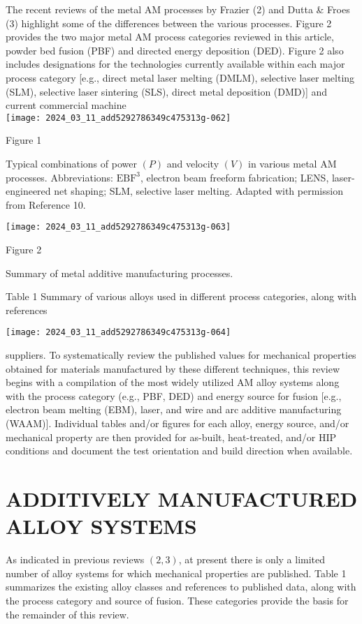 \documentclass[10pt]{article}
\begin{document}
The recent reviews of the metal AM processes by Frazier (2) and Dutta \& Froes (3) highlight some of the differences between the various processes. Figure 2 provides the two major metal AM process categories reviewed in this article, powder bed fusion (PBF) and directed energy deposition (DED). Figure 2 also includes designations for the technologies currently available within each major process category [e.g., direct metal laser melting (DMLM), selective laser melting (SLM), selective laser sintering (SLS), direct metal deposition (DMD)] and current commercial machine\\
\texttt{[image: 2024\_03\_11\_add5292786349c475313g-062]}

Figure 1

Typical combinations of power $(P)$ and velocity $(V)$ in various metal AM processes. Abbreviations: $\mathrm{EBF}^{3}$, electron beam freeform fabrication; LENS, laser-engineered net shaping; SLM, selective laser melting. Adapted with permission from Reference 10.

\begin{center}
\texttt{[image: 2024\_03\_11\_add5292786349c475313g-063]}
\end{center}

Figure 2

Summary of metal additive manufacturing processes.

Table 1 Summary of various alloys used in different process categories, along with references

\begin{center}
\texttt{[image: 2024\_03\_11\_add5292786349c475313g-064]}
\end{center}

suppliers. To systematically review the published values for mechanical properties obtained for materials manufactured by these different techniques, this review begins with a compilation of the most widely utilized AM alloy systems along with the process category (e.g., PBF, DED) and energy source for fusion [e.g., electron beam melting (EBM), laser, and wire and arc additive manufacturing (WAAM)]. Individual tables and/or figures for each alloy, energy source, and/or mechanical property are then provided for as-built, heat-treated, and/or HIP conditions and document the test orientation and build direction when available.

\section*{ADDITIVELY MANUFACTURED ALLOY SYSTEMS}
As indicated in previous reviews $(2,3)$, at present there is only a limited number of alloy systems for which mechanical properties are published. Table 1 summarizes the existing alloy classes and references to published data, along with the process category and source of fusion. These categories provide the basis for the remainder of this review.
\end{document}
